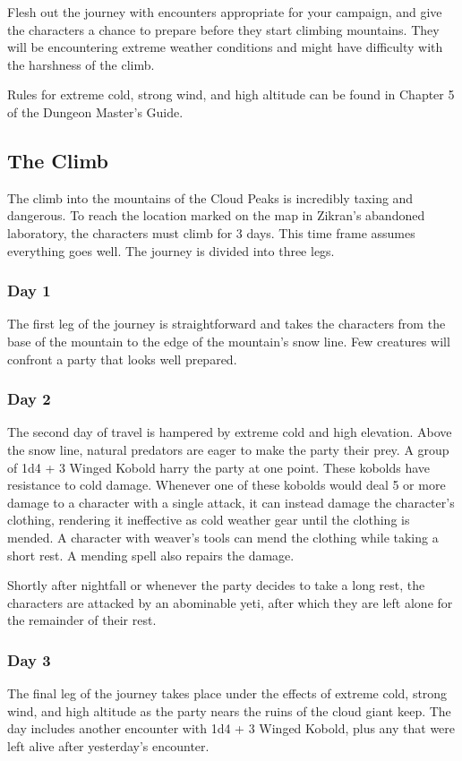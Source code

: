 \documentclass[10pt,a4paper,twoside,bg=print,twocolumn,openany,nodeprecatedcode]{dndbook}
\begin{document}
Flesh out the journey with encounters appropriate for your campaign, and give the characters a chance to prepare before they start climbing mountains. They will be encountering extreme weather conditions and might have difficulty with the harshness of the climb.

Rules for extreme cold, strong wind, and high altitude can be found in Chapter 5 of the Dungeon Master's Guide.

\subsection{The Climb}
The climb into the mountains of the Cloud Peaks is incredibly taxing and dangerous. To reach the location marked on the map in Zikran's abandoned laboratory, the characters must climb for 3 days. This time frame assumes everything goes well. The journey is divided into three legs.

\subsubsection{Day 1}
The first leg of the journey is straightforward and takes the characters from the base of the mountain to the edge of the mountain's snow line. Few creatures will confront a party that looks well prepared.

\subsubsection{Day 2}
The second day of travel is hampered by extreme cold and high elevation. Above the snow line, natural predators are eager to make the party their prey. A group of 1d4 + 3 Winged Kobold harry the party at one point. These kobolds have resistance to cold damage. Whenever one of these kobolds would deal 5 or more damage to a character with a single attack, it can instead damage the character's clothing, rendering it ineffective as cold weather gear until the clothing is mended. A character with weaver's tools can mend the clothing while taking a short rest. A mending spell also repairs the damage.

Shortly after nightfall or whenever the party decides to take a long rest, the characters are attacked by an abominable yeti, after which they are left alone for the remainder of their rest.

\subsubsection{Day 3}
The final leg of the journey takes place under the effects of extreme cold, strong wind, and high altitude as the party nears the ruins of the cloud giant keep. The day includes another encounter with 1d4 + 3 Winged Kobold, plus any that were left alive after yesterday's encounter.
\end{document}
